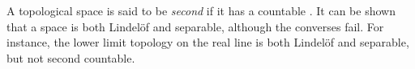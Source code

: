 \documentclass[12pt]{article}
\begin{document}
A topological space is said to be \emph{second } if it has a countable . 
It can be shown that a  space is both Lindel\"of and separable, although the converses fail.  For instance, the lower limit topology on the real line is both Lindel\"of and separable, but not second countable.
\end{document}
